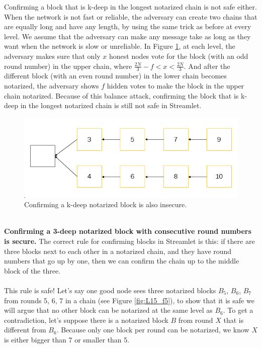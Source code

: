 Confirming a block that is k-deep in the longest notarized chain is not safe either. When the network is not fast or reliable, the adversary can create two chains that are equally long and have any length, by using the same trick as before at every level. We assume that the adversary can make any message take as long as they want when the network is slow or unreliable. In Figure \ref{fig:L15_f4}, at each level, the adversary makes sure that only $x$ honest nodes vote for the block (with an odd round number) in the upper chain, where  $\frac{2N}{3}-f < x < \frac{2N}{3}$. And after the different block (with an even round number) in the lower chain becomes notarized, the adversary shows $f$ hidden votes to make the block in the upper chain notarized. Because of this balance attack, confirming the block that is k-deep in the longest notarized chain is still not safe in Streamlet.
\begin{figure}[h!]
	\centering
	\includegraphics[width=0.5\linewidth]{Fig/15/F4}
	\caption{Confirming a k-deep notarized block is also insecure.}
	\label{fig:L15_f4}
\end{figure}\\
\textbf{Confirming a 3-deep notarized block with consecutive round numbers is secure.} The correct rule for confirming blocks in Streamlet is this: if there are three blocks next to each other in a notarized chain, and they have round numbers that go up by one, then we can confirm the chain up to the middle block of the three.\\\\
This rule is safe! Let’s say one good node sees three notarized blocks $B_5$, $B_6$, $B_7$ from rounds 5, 6, 7 in a chain (see Figure \ref{fig:L15_f5}), to show that it is safe we will argue that no other block can be notarized at the same level as $B_6$. To get a contradiction, let’s suppose there is a notarized block $B$ from round $X$ that is different from $B_6$. Because only one block per round can be notarized, we know $X$ is either bigger than 7 or smaller than 5.
